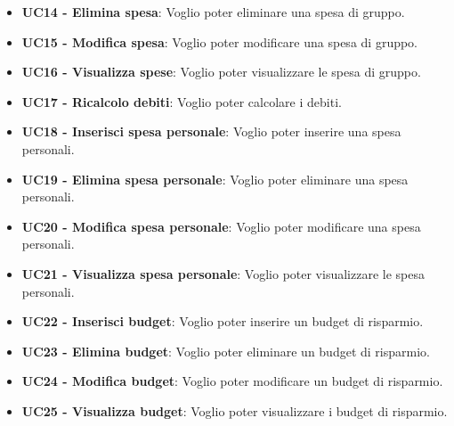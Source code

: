 \begin{itemize}
    \item \textbf{UC14 - Elimina spesa}: Voglio poter eliminare una spesa di gruppo.
    \item \textbf{UC15 - Modifica spesa}: Voglio poter modificare una spesa di gruppo.
    \item \textbf{UC16 - Visualizza spese}: Voglio poter visualizzare le spesa di gruppo.
    \item \textbf{UC17 - Ricalcolo debiti}: Voglio poter calcolare i debiti.
    \item \textbf{UC18 - Inserisci spesa personale}: Voglio poter inserire una spesa personali.
    \item \textbf{UC19 - Elimina spesa personale}: Voglio poter eliminare una spesa personali.
    \item \textbf{UC20 - Modifica spesa personale}: Voglio poter modificare una spesa personali.
    \item \textbf{UC21 - Visualizza spesa personale}: Voglio poter visualizzare le spesa personali.
    \item \textbf{UC22 - Inserisci budget}: Voglio poter inserire un budget di risparmio.
    \item \textbf{UC23 - Elimina budget}: Voglio poter eliminare un budget di risparmio.
    \item \textbf{UC24 - Modifica budget}: Voglio poter modificare un budget di risparmio.
    \item \textbf{UC25 - Visualizza budget}: Voglio poter visualizzare i budget di risparmio.
\end{itemize}
